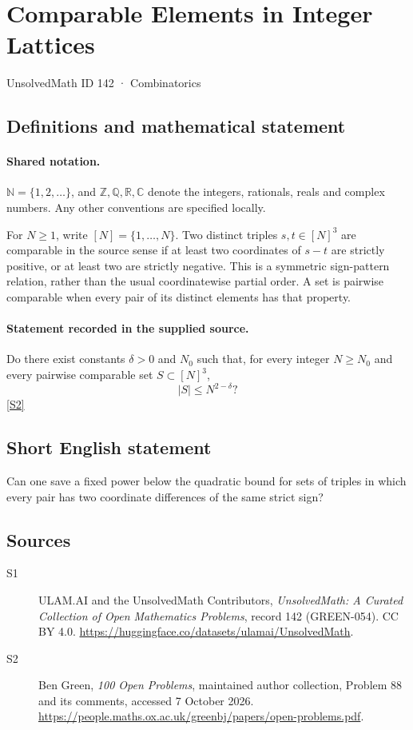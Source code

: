 \documentclass[11pt]{article}
\newcommand{\sref}[2]{\hyperlink{source:#1:#2}{[S#2]}}
\begin{document}
\setcounter{section}{141}
\section{Comparable Elements in Integer Lattices}\label{142}
{\small\sffamily UnsolvedMath ID 142 · Combinatorics}
\subsection{Definitions and mathematical statement}

\paragraph{Shared notation.}$\mathbb N=\{1,2,\ldots\}$, and $\mathbb Z,\mathbb Q,\mathbb R,\mathbb C$ denote the integers, rationals, reals and complex numbers. Any other conventions are specified locally.


For $N\geq1$, write $[N]=\{1,\ldots,N\}$. Two distinct triples $s,t\in[N]^3$ are comparable in the source sense if at least two coordinates of $s-t$ are strictly positive, or at least two are strictly negative. This is a symmetric sign-pattern relation, rather than the usual coordinatewise partial order. A set is pairwise comparable when every pair of its distinct elements has that property.
\paragraph{Statement recorded in the supplied source.}
Do there exist constants $\delta>0$ and $N_0$ such that, for every integer $N\geq N_0$ and every pairwise comparable set $S\subset[N]^3$,
\[
 |S|\leq N^{2-\delta}?
\] \sref{142}{2}
\subsection{Short English statement}
Can one save a fixed power below the quadratic bound for sets of triples in which every pair has two coordinate differences of the same strict sign?
\subsection{Sources}
\begin{description}
\item[\hypertarget{source:142:1}{S1}] ULAM.AI and the UnsolvedMath Contributors, \emph{UnsolvedMath: A Curated Collection of Open Mathematics Problems}, record 142 (GREEN-054). CC BY 4.0. \url{https://huggingface.co/datasets/ulamai/UnsolvedMath}.
\item[\hypertarget{source:142:2}{S2}] Ben Green, \emph{100 Open Problems}, maintained author collection, Problem 88 and its comments, accessed 7 October 2026. \url{https://people.maths.ox.ac.uk/greenbj/papers/open-problems.pdf}.
\end{description}
\label{end:142}
\end{document}
